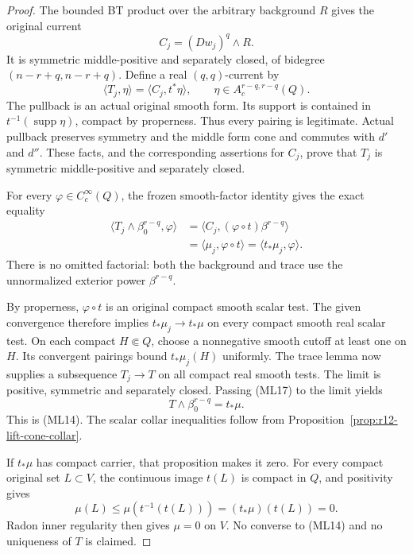 \documentclass[11pt,a4paper]{article}
\numberwithin{equation}{section}
\theoremstyle{definition}
\theoremstyle{remark}
\begin{document}
\begin{proof}
The bounded BT product over the arbitrary background $R$ gives
the original current
\[
                        C_j=(Dw_j)^q\wedge R.
 \tag{ML15}
\]
It is symmetric middle-positive and separately closed, of
bidegree $(n-r+q,n-r+q)$.  Define a real $(q,q)$-current by
\[
 \langle T_j,\eta\rangle=\langle C_j,t^*\eta\rangle,
        \qquad \eta\in A_c^{r-q,r-q}(Q).
 \tag{ML16}
\]
The pullback is an actual original smooth form.  Its support
is contained in $t^{-1}(\operatorname{supp}\eta)$, compact by
properness.  Thus every pairing is legitimate.  Actual pullback
preserves symmetry and the middle form cone and commutes with
$d'$ and $d''$.  These facts, and the corresponding assertions
for $C_j$, prove that $T_j$ is symmetric middle-positive and
separately closed.

For every $\varphi\in C_c^\infty(Q)$, the frozen
smooth-factor identity gives the exact equality
\[
 \begin{split}
 \langle T_j\wedge\beta_0^{r-q},\varphi\rangle
 &=\langle C_j,(\varphi\circ t)\beta^{r-q}\rangle\\
 &=\langle\mu_j,\varphi\circ t\rangle
  =\langle t_*\mu_j,\varphi\rangle.
 \end{split}
 \tag{ML17}
\]
There is no omitted factorial: both the background and trace
use the unnormalized exterior power $\beta^{r-q}$.

By properness, $\varphi\circ t$ is an original compact smooth
scalar test.  The given convergence therefore implies
$t_*\mu_j\to t_*\mu$ on every compact smooth real scalar test.
On each compact $H\Subset Q$, choose a nonnegative smooth
cutoff at least one on $H$.  Its convergent pairings bound
$t_*\mu_j(H)$ uniformly.  The trace lemma now supplies a
subsequence $T_j\to T$ on all compact real smooth tests.
The limit is positive, symmetric and separately closed.
Passing \textup{(ML17)} to the limit yields
\[
                         T\wedge\beta_0^{r-q}=t_*\mu.
 \tag{ML18}
\]
This is \textup{(ML14)}.  The scalar collar inequalities follow
from Proposition~\ref{prop:r12-lift-cone-collar}.

If $t_*\mu$ has compact carrier, that proposition makes it zero.
For every compact original set $L\subset V$, the continuous
image $t(L)$ is compact in $Q$, and positivity gives
\[
              \mu(L)\le\mu(t^{-1}(t(L)))=(t_*\mu)(t(L))=0.
\]
Radon inner regularity then gives $\mu=0$ on $V$.
No converse to \textup{(ML14)} and no uniqueness of $T$ is claimed.
\end{proof}
\end{document}
